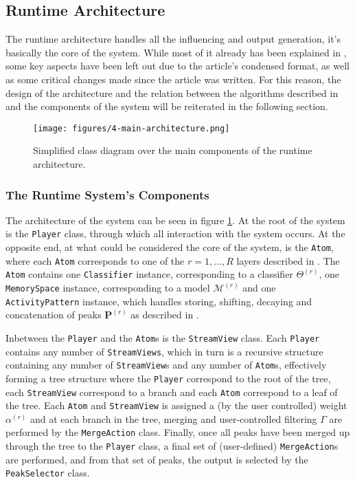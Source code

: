 \subsection{Runtime Architecture}\label{sec:4-main-architecture}
The runtime architecture handles all the influencing and output generation, it's basically the core of the system. While most of it already has been explained in \cite{borg_2019}, some key aspects have been left out due to the article's condensed format, as well as some critical changes made since the article was written. For this reason, the design of the architecture and the relation between the algorithms described in \cite{somaxtheory2021} and the components of the system will be reiterated in the following section.

 \begin{figure}[h]
    \centering        
 	\texttt{[image: figures/4-main-architecture.png]}
    \caption{Simplified class diagram over the main components of the runtime architecture.}
    \label{fig:4-main-architecture}
\end{figure}

\subsubsection{The Runtime System's Components}\label{sec:4-main-architecture-components}
The architecture of the system can be seen in figure \ref{fig:4-main-architecture}. At the root of the system is the \texttt{Player} class, through which all interaction with the system occurs. At the opposite end, at what could be considered the core of the system, is the \texttt{Atom}, where each \texttt{Atom} corresponds to one of the $r = 1,\dots,R$ layers described in \cite{somaxtheory2021}. The \texttt{Atom} contains one \texttt{Classifier} instance, corresponding to a classifier $\Theta^{(r)}$, one \texttt{MemorySpace} instance, corresponding to a model $\mathcal M^{(r)}$ and one \texttt{ActivityPattern} instance, which handles storing, shifting, decaying and concatenation of peaks $\bm P^{(r)}$ as described in \cite{somaxtheory2021}.
 
 Inbetween the \texttt{Player} and the \texttt{Atom}s is the \texttt{StreamView} class. Each \texttt{Player} contains any number of \texttt{StreamViews}, which in turn is a recursive structure containing any number of \texttt{StreamView}s and any number of \texttt{Atom}s, effectively forming a tree structure where the \texttt{Player} correspond to the root of the tree, each \texttt{StreamView} correspond to a branch and each \texttt{Atom} correspond to a leaf of the tree. Each \texttt{Atom} and \texttt{StreamView} is assigned a (by the user controlled) weight $\alpha^{(r)}$ and at each branch in the tree, merging and user-controlled filtering $\Gamma$ are performed by the \texttt{MergeAction} class. Finally, once all peaks have been merged up through the tree to the \texttt{Player} class, a final set of (user-defined) \texttt{MergeAction}s are performed, and from that set of peaks, the output is selected by the \texttt{PeakSelector} class.
 
